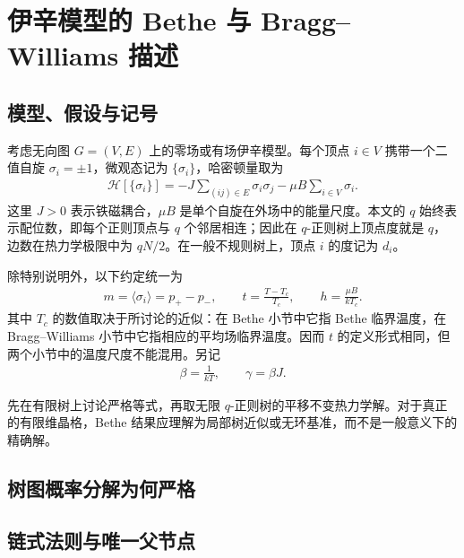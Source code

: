 \chapter{伊辛模型的 Bethe 与 Bragg--Williams 描述}

\section{模型、假设与记号}

考虑无向图 \(G=(V,E)\) 上的零场或有场伊辛模型。每个顶点 \(i\in V\) 携带一个二值自旋
\(\sigma_i=\pm1\)，微观态记为 \(\{\sigma_i\}\)，哈密顿量取为
\begin{align*}
	\mathcal H[\{\sigma_i\}]
	= -J\sum_{(ij)\in E}\sigma_i\sigma_j-\mu B\sum_{i\in V}\sigma_i .
\end{align*}
这里 \(J>0\) 表示铁磁耦合，\(\mu B\) 是单个自旋在外场中的能量尺度。本文的 \(q\) 始终表示配位数，即每个正则顶点与 \(q\) 个邻居相连；因此在 \(q\)-正则树上顶点度就是 \(q\)，边数在热力学极限中为 \(qN/2\)。在一般不规则树上，顶点 \(i\) 的度记为 \(d_i\)。

除特别说明外，以下约定统一为
\begin{align*}
	m=\langle\sigma_i\rangle=p_+-p_-,\qquad
t=\frac{T-T_c}{T_c},\qquad
h=\frac{\mu B}{kT_c}.
\end{align*}
其中 \(T_c\) 的数值取决于所讨论的近似：在 Bethe 小节中它指 Bethe 临界温度，在 Bragg--Williams 小节中它指相应的平均场临界温度。因而 \(t\) 的定义形式相同，但两个小节中的温度尺度不能混用。另记
\begin{align*}
	\beta=\frac{1}{kT},\qquad \gamma=\beta J.
\end{align*}

先在有限树上讨论严格等式，再取无限 \(q\)-正则树的平移不变热力学解。对于真正的有限维晶格，Bethe 结果应理解为局部树近似或无环基准，而不是一般意义下的精确解。

\section{树图概率分解为何严格}

\section{链式法则与唯一父节点}

